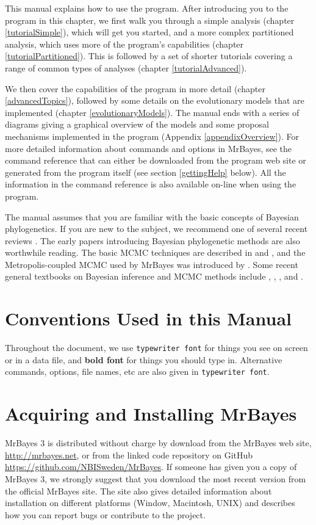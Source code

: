 \documentclass[12pt]{book}
\begin{document}
This manual explains how to use the program. After introducing you to the program in this chapter,
we first walk you through a simple analysis (chapter \ref{tutorialSimple}), which will get you
started, and a more complex partitioned analysis, which uses more of the program's capabilities
(chapter \ref{tutorialPartitioned}). This is followed by a set of shorter tutorials covering a
range of common types of analyses (chapter \ref{tutorialAdvanced}). 

We then cover the capabilities of the program in more detail (chapter \ref{advancedTopics}),
followed by some details on the evolutionary models that are implemented (chapter
\ref{evolutionaryModels}). The manual ends with a series of diagrams giving a graphical overview of
the models and some proposal mechanisms implemented in the program (Appendix
\ref{appendixOverview}). For more detailed information about commands and options in MrBayes, see
the command reference that can either be downloaded from the program web site or generated from the
program itself (see section \ref{gettingHelp} below). All the information in the command reference
is also available on-line when using the program.

The manual assumes that you are familiar with the basic concepts of Bayesian phylogenetics. If you
are new to the subject, we recommend one of several recent reviews \citep{lewis01, holder03,
ronquist10}. The early papers introducing Bayesian phylogenetic methods \citep{li96, mau96,
rannala96, mau97, larget99, mau99, newton99} are also worthwhile reading. The basic MCMC techniques
are described in \citet{metropolis53} and \citet{hastings70}, and the Metropolis-coupled MCMC used
by MrBayes was introduced by \citet{geyer91}. Some recent general textbooks on Bayesian inference
and MCMC methods include \citet{gilks96a}, \citet{carlin00}, \citet{gelman03}, and
\citet{gamerman06}.


\section{Conventions Used in this Manual}
Throughout the document, we use \texttt{typewriter font} for things you see on screen or in a data
file, and \textbf{bold font} for things you should type in. Alternative commands, options, file
names, etc are also given in \texttt{typewriter font}.

\section{Acquiring and Installing MrBayes}
MrBayes 3 is distributed without charge by download from the MrBayes web site,
\url{http://mrbayes.net}, or from the linked code repository on GitHub
\url{https://github.com/NBISweden/MrBayes}.  If someone has given you a copy of MrBayes 3, we
strongly suggest that you download the most recent version from the official MrBayes site. The site
also gives detailed information about installation on different platforms (Window, Macintosh, UNIX)
and describes how you can report bugs or contribute to the project.
\end{document}
